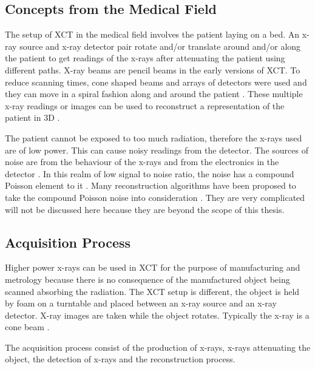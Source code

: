\subsection{Concepts from the Medical Field}

The setup of XCT \citep{cormack1973reconstruction, hounsfield1973computerized, hounsfield1980computed} in the medical field involves the patient laying on a bed. An x-ray source and x-ray detector pair rotate and/or translate around and/or along the patient to get readings of the x-rays after attenuating the patient using different paths. X-ray beams are pencil beams in the early versions of XCT. To reduce scanning times, cone shaped beams and arrays of detectors were used and they can move in a spiral fashion along and around the patient \citep{cierniak2011x}. These multiple x-ray readings or images can be used to reconstruct a representation of the patient in 3D \citep{zeng2010medical}.

The patient cannot be exposed to too much radiation, therefore the x-rays used are of low power. This can cause noisy readings from the detector. The sources of noise are from the behaviour of the x-rays and from the electronics in the detector \citep{yang2010noise}. In this realm of low signal to noise ratio, the noise has a compound Poisson element to it \citep{whiting2002signal, whiting2006properties}. Many reconstruction algorithms have been proposed to take the compound Poisson noise into consideration \citep{elbakri2002statistical, elbakri2003efficient, elbakri2003statistical, lasio2007statistical, xie2008x}. They are very complicated will not be discussed here because they are beyond the scope of this thesis.

\subsection{Acquisition Process}

Higher power x-rays can be used in XCT for the purpose of manufacturing and metrology because there is no consequence of the manufactured object being scanned absorbing the radiation. The XCT setup is different, the object is held by foam on a turntable and placed between an x-ray source and an x-ray detector. X-ray images are taken while the object rotates. Typically the x-ray is a cone beam \citep{kruth2011computed}.

The acquisition process consist of the production of x-rays, x-rays attenuating the object, the detection of x-rays and the reconstruction process.

